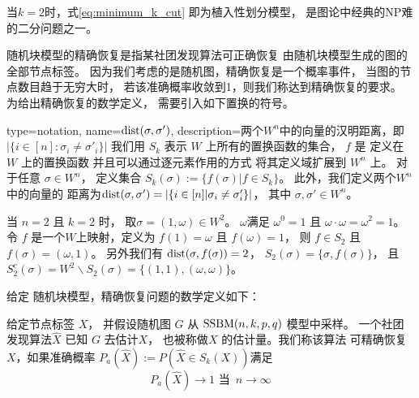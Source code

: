 当$k=2$时，式\eqref{eq:minimum_k_cut} 即为植入性划分模型，
是图论中经典的NP难的二分问题之一。


随机块模型的精确恢复是指某社团发现算法可正确恢复
由随机块模型生成的图的全部节点标签。
因为我们考虑的是随机图，精确恢复是一个概率事件，
当图的节点数目趋于无穷大时，
若该准确概率收敛到1，则我们称达到精确恢复的要求。
为给出精确恢复的数学定义，
需要引入如下置换的符号。

{
  type=notation,
  name={$\operatorname{dist}(\sigma, \sigma')$},
  description={两个$W^n$中的向量的汉明距离，即$|\{i\in[n]:\sigma_i\neq \sigma'_i\}|$}
}
我们用 $S_k$ 表示 $W$  上所有的置换函数的集合， 
$f$ 是 定义在 $W$ 上的置换函数
并且可以通过逐元素作用的方式
将其定义域扩展到 $W^n$ 上。
对于任意 $\sigma \in W^n$，
定义集合 $S_k(\sigma):=\{f(\sigma)| f\in S_k\}$。
此外，我们定义两个$W^n$中的向量的
距离为$\operatorname{dist}(\sigma, \sigma')=|\{i\in[n] |\sigma_i\neq \sigma'_i\}|$，
其中 $\sigma,\sigma'\in W^n
$。
\begin{example}
当 $n=2$ 且 $k=2$ 时，
取$\sigma=(1, \omega) \in W^2$。
$\omega$满足
$\omega^0 = 1$ 且 $\omega \cdot \omega = \omega^2 = 1$。
令 $f$ 是一个$W$上映射，定义为
$f(1) = \omega$ 且 $f(\omega)=1$，
则 $f \in S_2$ 且 $f(\sigma) = (\omega, 1)$。
另外我们有 $\operatorname{dist}(\sigma, f(\sigma)) = 2$，
$S_2(\sigma) = \{\sigma, f(\sigma)\}$， 且
$S_2^c(\sigma) = W^2 \backslash S_2(\sigma)
=\{(1, 1), (\omega, \omega)\}$。
\end{example}

给定 随机块模型，精确恢复问题的数学定义如下：
\begin{definition} \label{def:SSBMR}
给定节点标签 $X$，
并假设随机图 $G$ 从 $\operatorname{SSBM}(n,k,p,q)$ 模型中采样。
一个社团发现算法$\hat{X}$ 已知 $G$ 去估计$X$，
也被称做$X$ 的估计量。我们称该算法
可精确恢复$X$，如果准确概率
$P_a(\hat{X}):=P(\hat{X} \in S_k(X)) $满足
\begin{equation}\label{eq:Pa_hat_X}
P_a(\hat{X})
\to 1 \textrm{ 当 }\, n \to \infty
\end{equation}
\end{definition}

